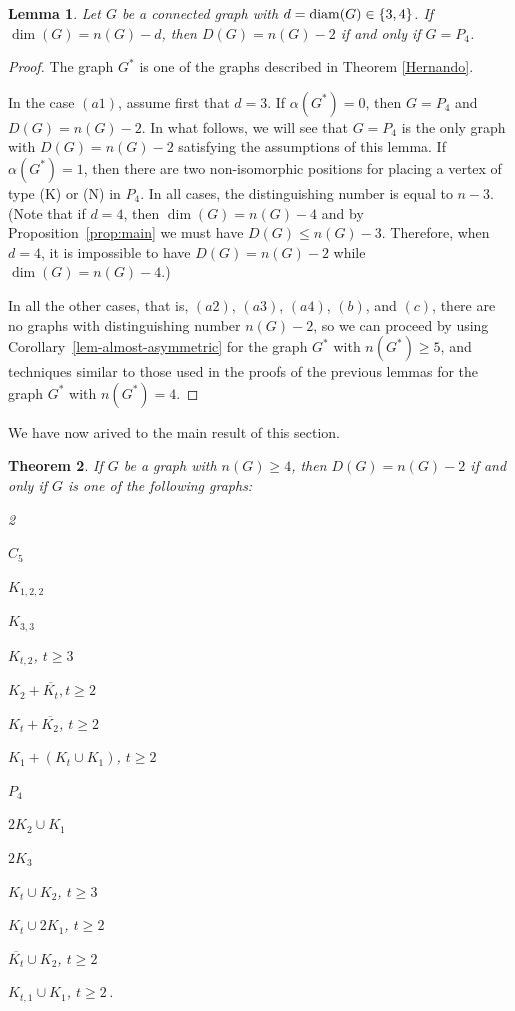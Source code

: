 \documentclass[12pt]{article}
\newtheorem{theorem}{Theorem}[section]
\newtheorem{lemma}[theorem]{Lemma}
\DeclareMathOperator {\diam} {{\rm diam}}
\begin{document}
\begin{lemma}\label{Hernando-Lem}
Let $G$ be a connected graph with $d = \diam(G) \in \{3, 4\}$. If $\dim(G) = n(G) - d$, then $D(G)=n(G)-2$ if and only if $G=P_4$. 
\end{lemma}

\begin{proof} 
The graph $G^{\ast}$ is one of the graphs described in Theorem \ref{Hernando}. 

In the case $(a1)$, assume first that $d=3$.
If $\alpha(G^{\ast})=0$, then $G=P_4$ and $D(G)=n(G) - 2$. 
In what follows, we will see that $G=P_4$ is the only graph with $D(G)=n(G)-2$ satisfying the assumptions of this lemma.
If $\alpha(G^{\ast})=1$, then there are two non-isomorphic positions for placing a vertex of type (K) or (N) in $P_4$. In all cases, the distinguishing number is equal to $n-3$. 
(Note that if $d=4$, then $\dim(G)=n(G)-4$ and by Proposition~\ref{prop:main} we must have $D(G)\leq n(G)-3$. 
Therefore, when $d=4$, it is impossible to have $D(G)= n(G)-2$ while $\dim(G)=n(G)-4$.)

In all the other cases, that is, $(a2)$, $(a3)$, $(a4)$, $(b)$, and $(c)$, there are no graphs with distinguishing number $n(G)-2$, so we can proceed by using 
Corollary~\ref{lem-almost-asymmetric} for the graph $G^{\ast}$ with $n(G^{\ast})\geq 5$, and techniques similar to those used in the proofs of the previous lemmas for the graph $G^{\ast}$ with $n(G^{\ast})=4$.
\end{proof}

We have now arived to the main result of this section. 

\begin{theorem}
If $G$ be a graph with $n(G)\geq 4$, then $D(G)=n(G)-2$ if and only if $G$ is one of the following graphs: 
\begin{itemize}
\begin{small}
\begin{multicols}{2}
\item[(1)] 
$C_5$ 
\item[(3)] 
$K_{1,2,2}$  
\item[(5)] 
$K_{3,3}$
\item[(7)] 
$K_{t,2}$, $t\geq 3$ 
\item[(9)] 
$K_{2}+ \overline{K_t}, t\geq 2$  
\item[(11)] 
$K_t + \overline{K_2}$, $t\geq 2$ 
\item[(13)] 
$K_1 + (K_t \cup K_1)$, $t\geq 2$
\item[(2)] 
$P_4$
\item[(4)] 
$2K_2 \cup K_1$ 
\item[(6)] 
$2K_3$ 
\item[(8)] 
$K_{t}\cup K_2$, $t\geq 3$ 
\item[(10)] 
$K_t \cup 2K_1$, $t\geq 2$ 
\item[(12)] 
$\overline{K_t}\cup K_2$, $t\geq 2$  
\item[(14)] 
$K_{t, 1}\cup K_1$, $t\geq 2$\,. 
\end{multicols} 
\end{small}
\end{itemize}
\end{theorem}
\end{document}
